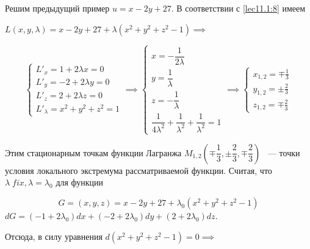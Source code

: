 \documentclass[../../main.tex]{subfiles}
\begin{document}
	\begin{exmp}
	
	Решим предыдущий пример $u = x - 2y + 27$. В 
	соответствии с \eqref{lec11.1:8} имеем 
	
	$L \left( x, y, \lambda \right) = x - 2y + 27 + \lambda \left( x^2 + y^2 
	+ z^2 - 1 \right) \implies$ 
	
	\[
	\begin{cases}
	L'_x = 1 + 2 \lambda x = 0 \\
	L'_y = -2 + 2 \lambda y = 0 \\
	L'_z = 2 + 2 \lambda z = 0 \\
	L'_\lambda = x^2 + y^2 + z^2 = 1
	\end{cases} \implies
	\begin{cases}
	x = -\dfrac{1}{2\lambda} \\
	y = \dfrac{1}{\lambda} \\
	z = -\dfrac{1}{\lambda} \\
	\dfrac{1}{4\lambda^2} + \dfrac{1}{\lambda^2} + \dfrac{1}{\lambda^2} = 1
	\end{cases} \implies
	\begin{cases}
	x_{1, 2} = \mp \frac{1}{3} \\
	y_{1, 2} = \pm \frac{2}{3} \\
	z_{1, 2} = \mp \frac{2}{3} 
	\end{cases}
	\]
	
	Этим стационарным точкам функции Лагранжа $M_{1, 2} \left( \mp \dfrac{1}{3}, 
	\pm \dfrac{2}{3}, \mp \dfrac{2}{3} \right) $ ~--- точки условия локального
	экстремума рассматриваемой функции. Считая, что $\lambda\; fix, 
	\lambda = \lambda_0$ для функции
	
	\[G = \left( x, y, z \right) = x - 2y + 27 + 
	\lambda_0\left( x^2 + y^2 + z^2 - 1 \right)\]
	$
	dG = \left( -1 + 2 \lambda_0 \right)dx + \left( -2 + 2\lambda_0 \right)dy 
	+ \left( 2 + 2 \lambda_0 \right) dz $.
	\smallskip
	
	Отсюда, в силу 	уравнения $d\left( x^2 + y^2 + z^2 - 1 
	\right) = 0 \implies$
	

\end{exmp}
\end{document}
